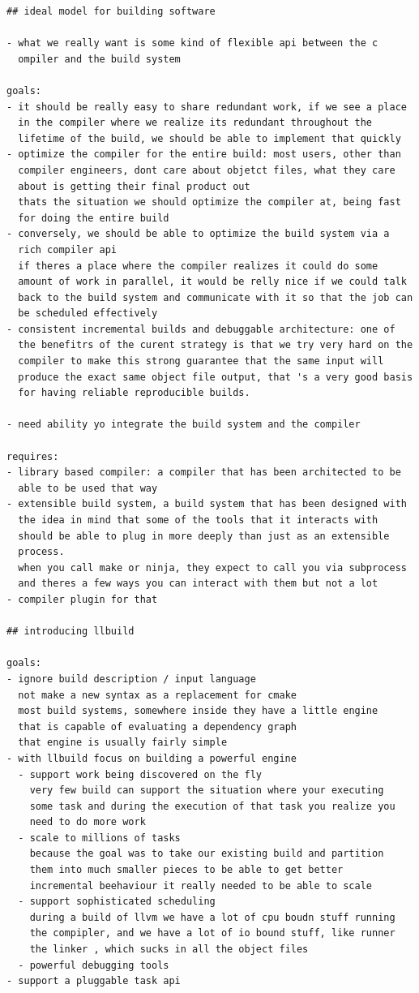 \documentclass[12pt, a4paper]{report}
\begin{document}
\begin{Verbatim}[fontsize=\small]
## ideal model for building software

- what we really want is some kind of flexible api between the c
  ompiler and the build system

goals:
- it should be really easy to share redundant work, if we see a place
  in the compiler where we realize its redundant throughout the
  lifetime of the build, we should be able to implement that quickly
- optimize the compiler for the entire build: most users, other than
  compiler engineers, dont care about objetct files, what they care
  about is getting their final product out
  thats the situation we should optimize the compiler at, being fast
  for doing the entire build
- conversely, we should be able to optimize the build system via a
  rich compiler api
  if theres a place where the compiler realizes it could do some
  amount of work in parallel, it would be relly nice if we could talk
  back to the build system and communicate with it so that the job can
  be scheduled effectively
- consistent incremental builds and debuggable architecture: one of
  the benefitrs of the curent strategy is that we try very hard on the
  compiler to make this strong guarantee that the same input will
  produce the exact same object file output, that 's a very good basis
  for having reliable reproducible builds.

- need ability yo integrate the build system and the compiler

requires:
- library based compiler: a compiler that has been architected to be
  able to be used that way
- extensible build system, a build system that has been designed with
  the idea in mind that some of the tools that it interacts with
  should be able to plug in more deeply than just as an extensible
  process.
  when you call make or ninja, they expect to call you via subprocess
  and theres a few ways you can interact with them but not a lot
- compiler plugin for that

## introducing llbuild

goals:
- ignore build description / input language
  not make a new syntax as a replacement for cmake
  most build systems, somewhere inside they have a little engine
  that is capable of evaluating a dependency graph
  that engine is usually fairly simple
- with llbuild focus on building a powerful engine
  - support work being discovered on the fly
    very few build can support the situation where your executing
    some task and during the execution of that task you realize you
    need to do more work
  - scale to millions of tasks
    because the goal was to take our existing build and partition
    them into much smaller pieces to be able to get better
    incremental beehaviour it really needed to be able to scale
  - support sophisticated scheduling
    during a build of llvm we have a lot of cpu boudn stuff running
    the compipler, and we have a lot of io bound stuff, like runner
    the linker , which sucks in all the object files
  - powerful debugging tools
- support a pluggable task api


\end{Verbatim}
\end{document}
